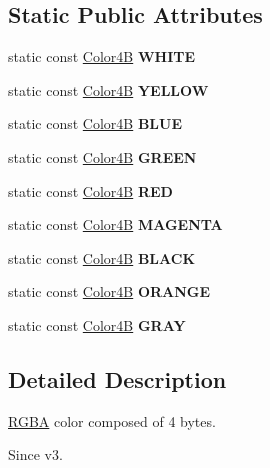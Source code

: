 \subsection*{Static Public Attributes}
\begin{DoxyCompactItemize}
\item 
\mbox{\label{structColor4B_a7d71f0a3ec5bdb22bb32b2c2bca37e44}} 
static const \hyperlink{structColor4B}{Color4B} {\bfseries W\+H\+I\+TE}
\item 
\mbox{\label{structColor4B_abba7dd224b7bc1ec33ca638d32565e46}} 
static const \hyperlink{structColor4B}{Color4B} {\bfseries Y\+E\+L\+L\+OW}
\item 
\mbox{\label{structColor4B_ad3a76ac9998859ed3a3406de23e1d2a8}} 
static const \hyperlink{structColor4B}{Color4B} {\bfseries B\+L\+UE}
\item 
\mbox{\label{structColor4B_a4804aa0e42bc4a0b42cb330a09fc544c}} 
static const \hyperlink{structColor4B}{Color4B} {\bfseries G\+R\+E\+EN}
\item 
\mbox{\label{structColor4B_aa009c68b349f1e2520f70b9034d22dca}} 
static const \hyperlink{structColor4B}{Color4B} {\bfseries R\+ED}
\item 
\mbox{\label{structColor4B_ad26b43777c26052e26b0b432bfe16b19}} 
static const \hyperlink{structColor4B}{Color4B} {\bfseries M\+A\+G\+E\+N\+TA}
\item 
\mbox{\label{structColor4B_a148ce1242b0a3932b19f255def4877ed}} 
static const \hyperlink{structColor4B}{Color4B} {\bfseries B\+L\+A\+CK}
\item 
\mbox{\label{structColor4B_a500a134c28570593e2554b3b562ff1f8}} 
static const \hyperlink{structColor4B}{Color4B} {\bfseries O\+R\+A\+N\+GE}
\item 
\mbox{\label{structColor4B_aeb35f8ae5af6eccc1fb2e270678ac9e3}} 
static const \hyperlink{structColor4B}{Color4B} {\bfseries G\+R\+AY}
\end{DoxyCompactItemize}


\subsection{Detailed Description}
\hyperlink{structRGBA}{R\+G\+BA} color composed of 4 bytes. \begin{DoxySince}{Since}
v3. 
\end{DoxySince}


